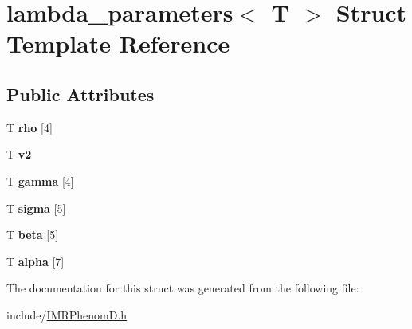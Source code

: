 \hypertarget{structlambda__parameters}{}\section{lambda\+\_\+parameters$<$ T $>$ Struct Template Reference}
\label{structlambda__parameters}
\subsection*{Public Attributes}
\begin{DoxyCompactItemize}
\item 
\mbox{\label{structlambda__parameters_a08f293753fe41b88fdd8a206b593a6c8}} 
T {\bfseries rho} \mbox{[}4\mbox{]}
\item 
\mbox{\label{structlambda__parameters_a35ec87e1f27de9393a6e94d18cd63c52}} 
T {\bfseries v2}
\item 
\mbox{\label{structlambda__parameters_a49db18626c20bd43f25c5c760679ac2a}} 
T {\bfseries gamma} \mbox{[}4\mbox{]}
\item 
\mbox{\label{structlambda__parameters_aefdccc025bcb819ec4b8009b232cf9b2}} 
T {\bfseries sigma} \mbox{[}5\mbox{]}
\item 
\mbox{\label{structlambda__parameters_a4aa387f5a44b09541304c5e2f8f3aad6}} 
T {\bfseries beta} \mbox{[}5\mbox{]}
\item 
\mbox{\label{structlambda__parameters_aec862d891bc928fb1faf042aff322802}} 
T {\bfseries alpha} \mbox{[}7\mbox{]}
\end{DoxyCompactItemize}


The documentation for this struct was generated from the following file\+:\begin{DoxyCompactItemize}
\item 
include/\hyperlink{IMRPhenomD_8h}{I\+M\+R\+Phenom\+D.\+h}\end{DoxyCompactItemize}
